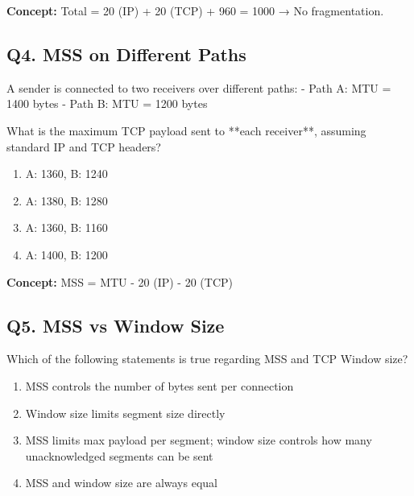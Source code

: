 \textbf{Concept:} Total = 20 (IP) + 20 (TCP) + 960 = 1000 → No fragmentation.


\subsection*{Q4. MSS on Different Paths}
A sender is connected to two receivers over different paths:
- Path A: MTU = 1400 bytes
- Path B: MTU = 1200 bytes

What is the maximum TCP payload sent to **each receiver**, assuming standard IP and TCP headers?

\begin{enumerate}[label=(\alph*)]
    \item A: 1360, B: 1240
    \item A: 1380, B: 1280
    \item A: 1360, B: 1160
    \item A: 1400, B: 1200
\end{enumerate}

\textbf{Concept:} MSS = MTU - 20 (IP) - 20 (TCP)


\subsection*{Q5. MSS vs Window Size}
Which of the following statements is true regarding MSS and TCP Window size?

\begin{enumerate}[label=(\alph*)]
    \item MSS controls the number of bytes sent per connection
    \item Window size limits segment size directly
    \item MSS limits max payload per segment; window size controls how many unacknowledged segments can be sent
    \item MSS and window size are always equal
\end{enumerate}

